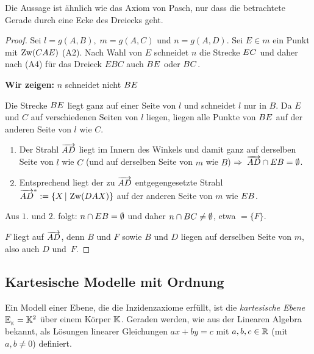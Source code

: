 Die Aussage ist ähnlich wie das Axiom von Pasch, nur dass die betrachtete Gerade durch eine Ecke des
Dreiecks geht.

\begin{proof}
    Sei $l = g(A,B),\; m = g(A,C)$ und $n = g(A,D)$. Sei $E \in m$ ein Punkt mit $\operatorname{Zw}(CAE)$ (A2).
    Nach Wahl von $E$ schneidet $n$ die Strecke ${EC}$ und daher nach (A4) für das Dreieck $EBC$
    auch ${BE}$ oder ${BC}$.

    {\bf Wir zeigen:} $n$ schneidet nicht ${BE}$

    \begin{figure}[ht]
        
    \end{figure}

    Die Strecke ${BE}$ liegt ganz auf einer Seite von $l$ und schneidet $l$ nur in $B$. Da $E$
    und $C$ auf verschiedenen Seiten von $l$ liegen, liegen alle Punkte von ${BE}$ auf der
    anderen Seite von $l$ wie $C$.
    \renewcommand{\labelenumi}{\arabic{enumi}.} %
    \begin{enumerate}
        \item Der Strahl $\mbox{${\overrightarrow{AD}}$}$ liegt im Innern des Winkels und damit ganz auf derselben Seite
            von $l$ wie $C$ (und auf derselben Seite von $m$ wie $B$) $\Rightarrow\;
            \mbox{${\overrightarrow{AD}}$} \cap {EB} = \emptyset$.

        \item Entsprechend liegt der zu $\mbox{${\overrightarrow{AD}}$}$ entgegengesetzte Strahl $\mbox{${\overrightarrow{AD}}$}^* := \{X \, | \,
            \operatorname{Zw}(DAX)\}$ auf der anderen Seite von $m$ wie ${EB}$.
    \end{enumerate}
    Aus $1.$ und $2.$ folgt: $n \cap {EB} = \emptyset$ und daher $n \cap {BC} \neq
    \emptyset$, etwa $= \{F\}$.

    $F$ liegt auf $\mbox{${\overrightarrow{AD}}$}$, denn $B$ und $F$ sowie $B$ und $D$ liegen auf derselben Seite von $m$,
    also auch $D$ und~$F$.
\end{proof}

\subsection{Kartesische Modelle mit Ordnung}

Ein Modell einer Ebene, die die Inzidenzaxiome erfüllt, ist die {\em kartesische Ebene} $\mathbb E_{_\mathbb K} =
\mathbb K^2$ über einem Körper $\mathbb K$.  Geraden werden, wie aus der Linearen Algebra bekannt, als Lösungen
linearer Gleichungen $a x + b y = c$ mit $a, b, c \in \mathbb R$ (mit $a, b \neq 0$) definiert.

